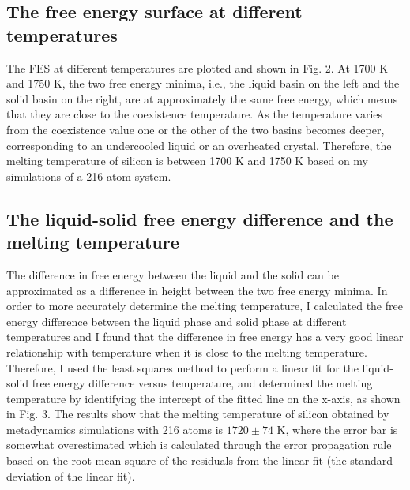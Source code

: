 \documentclass{article}
\begin{document}
\subsection{The free energy surface at different temperatures}

The FES at different temperatures are plotted and shown in Fig. 2. At 1700 K and 1750 K, the two free energy minima, i.e., the liquid basin on the left and the solid basin on the right, are at approximately the same free energy, which means that they are close to the coexistence temperature. As the temperature varies from the coexistence value one or the other of the two basins becomes deeper, corresponding to an undercooled liquid or an overheated crystal. Therefore, the melting temperature of silicon is between 1700 K and 1750 K based on my simulations of a 216-atom system.

\subsection{The liquid-solid free energy difference and the melting temperature}

The difference in free energy between the liquid and the solid can be approximated as a difference in height between the two free energy minima. In order to more accurately determine the melting temperature, I calculated the free energy difference between the liquid phase and solid phase at different temperatures and I found that the difference in free energy has a very good linear relationship with temperature when it is close to the melting temperature. Therefore, I used the least squares method to perform a linear fit for the liquid-solid free energy difference versus temperature, and determined the melting temperature by identifying the intercept of the fitted line on the x-axis, as shown in Fig. 3. The results show that the melting temperature of silicon obtained by metadynamics simulations with 216 atoms is $1720 \pm 74$ K, where the error bar is somewhat overestimated which is calculated through the error propagation rule based on the root-mean-square of the residuals from the linear fit (the standard deviation of the linear fit).
\end{document}
